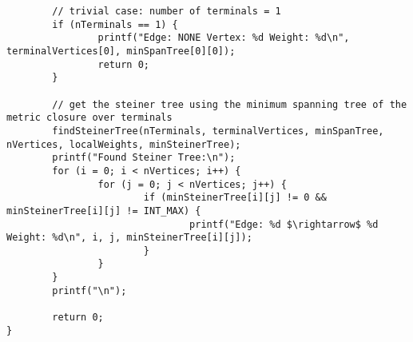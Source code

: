 \documentclass[a4paper]{article}
\begin{document}
\begin{lstlisting}
        // trivial case: number of terminals = 1
        if (nTerminals == 1) {
                printf("Edge: NONE Vertex: %d Weight: %d\n", terminalVertices[0], minSpanTree[0][0]);
                return 0;
        }

        // get the steiner tree using the minimum spanning tree of the metric closure over terminals
        findSteinerTree(nTerminals, terminalVertices, minSpanTree, nVertices, localWeights, minSteinerTree);
        printf("Found Steiner Tree:\n");
        for (i = 0; i < nVertices; i++) {
                for (j = 0; j < nVertices; j++) {
                        if (minSteinerTree[i][j] != 0 && minSteinerTree[i][j] != INT_MAX) {
                                printf("Edge: %d $\rightarrow$ %d Weight: %d\n", i, j, minSteinerTree[i][j]);
                        }
                }
        }
        printf("\n");

        return 0;
}
\end{lstlisting}
\end{document}
